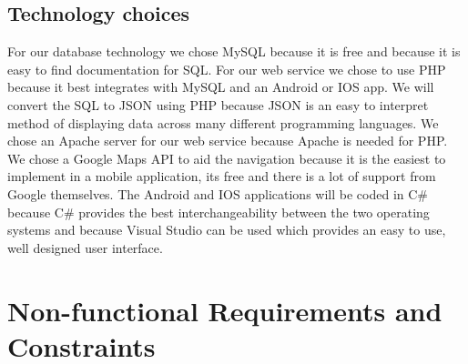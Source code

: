 \documentclass{article}
\begin{document}
		
		\clearpage
		
		\subsection{Technology choices}

For our database technology we chose MySQL because it is free and because it is easy to find documentation for SQL.  For our web service we chose to use PHP because it best integrates with MySQL and an Android or IOS app.  We will convert the SQL to JSON using PHP because JSON is an easy to interpret method of displaying data across many different programming languages. We chose an Apache server for our web service because Apache is needed for PHP.  We chose a Google Maps API to aid the navigation because it is the easiest to implement in a mobile application, its free and there is a lot of support from Google themselves. The Android and IOS applications will be coded in C\# because C\# provides the best interchangeability between the two operating systems and because Visual Studio can be used which provides an easy to use, well designed user interface.
		
	\section{Non-functional Requirements and Constraints}\label{sec: non-functional-requirments}
	
\end{document}

